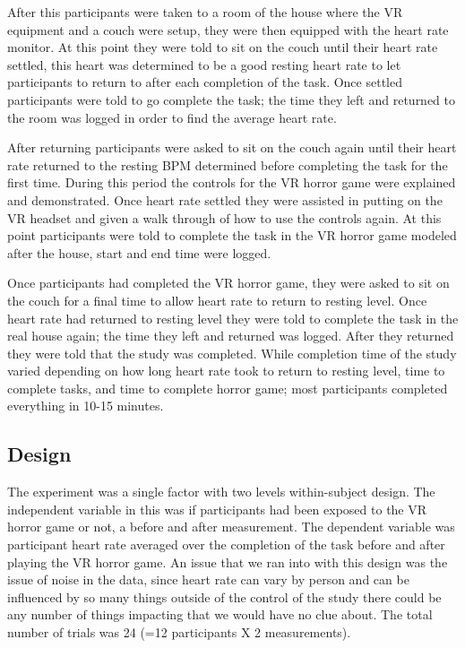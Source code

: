 \documentclass[manuscript,screen,review]{acmart}
\begin{document}
After this participants were taken to a room of the house where the VR equipment and a couch were setup, they were then equipped with the heart rate monitor. At this point they were told to sit on the couch until their heart rate settled, this heart was determined to be a good resting heart rate to let participants to return to after each completion of the task. Once settled participants were told to go complete the task; the time they left and returned to the room was logged in order to find the average heart rate.

After returning participants were asked to sit on the couch again until their heart rate returned to the resting BPM determined before completing the task for the first time. During this period the controls for the VR horror game were explained and demonstrated. Once heart rate settled they were assisted in putting on the VR headset and given a walk through of how to use the controls again. At this point participants were told to complete the task in the VR horror game modeled after the house, start and end time were logged.

Once participants had completed the VR horror game, they were asked to sit on the couch for a final time to allow heart rate to return to resting level. Once heart rate had returned to resting level they were told to complete the task in the real house again; the time they left and returned was logged. After they returned they were told that the study was completed. While completion time of the study varied depending on how long heart rate took to return to resting level, time to complete tasks, and time to complete horror game; most participants completed everything in 10-15 minutes.

\subsection{Design}

The experiment was a single factor with two levels within-subject design. The independent variable in this was if participants had been exposed to the VR horror game or not, a before and after measurement. The dependent variable was participant heart rate averaged over the completion of the task before and after playing the VR horror game. An issue that we ran into with this design was the issue of noise in the data, since heart rate can vary by person and can be influenced by so many things outside of the control of the study there could be any number of things impacting that we would have no clue about. The total number of trials was 24 (=12 participants X 2 measurements).
\end{document}
